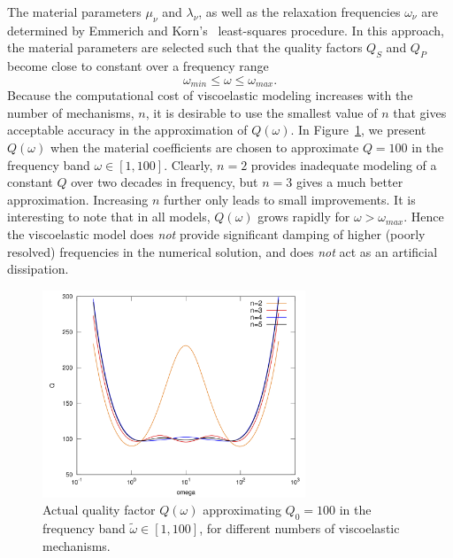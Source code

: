 \documentclass[11pt]{report}
\begin{document}
The material parameters $\mu_\nu$ and $\lambda_{\nu}$, as well as the relaxation frequencies
$\omega_\nu$ are determined by Emmerich and Korn's~\cite{Emm-Korn-87} least-squares procedure. In
this approach, the material parameters are selected such that the quality factors $Q_S$ and $Q_P$ become close to constant
over a frequency range
\[
\omega_{min}\leq \omega \leq \omega_{max}.
\]
Because the computational cost of viscoelastic modeling increases with the number of mechanisms,
$n$, it is desirable to use the smallest value of $n$ that gives acceptable accuracy in the
approximation of $Q(\omega)$. In Figure~\ref{fig:q2-5}, we present $Q(\omega)$ when the material
coefficients are chosen to approximate $Q=100$ in the frequency band $\omega\in[1,100]$. Clearly,
$n=2$ provides inadequate modeling of a constant $Q$ over two decades in frequency, but $n= 3$ gives
a much better approximation. Increasing $n$ further only leads to small improvements. It is
interesting to note that in all models, $Q(\omega)$ grows rapidly for $\omega>\omega_{max}$. Hence
the viscoelastic model does {\em not} provide significant damping of higher (poorly resolved)
frequencies in the numerical solution, and does {\em not} act as an artificial dissipation.
\begin{figure}
\begin{centering}
\includegraphics[width=0.7\textwidth]{q2-5.png}
\caption{Actual quality factor $Q(\omega)$ approximating $Q_0=100$ in the frequency band
  $\tilde\omega\in[1,100]$, for different numbers of viscoelastic mechanisms.}
\label{fig:q2-5}
\end{centering}
\end{figure}
\end{document}
